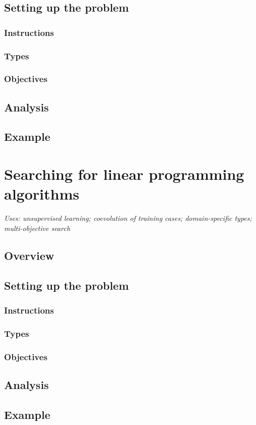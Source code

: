 \documentclass[12pt]{article}
\begin{document}
\subsection{Setting up the problem}

\subsubsection{Instructions}

\subsubsection{Types}

\subsubsection{Objectives}

\subsection{Analysis}

\subsection{Example}

\section{Searching for linear programming algorithms}

\textit{Uses: unsupervised learning; coevolution of training cases; domain-specific types; multi-objective search}

\subsection{Overview}

\subsection{Setting up the problem}

\subsubsection{Instructions}

\subsubsection{Types}

\subsubsection{Objectives}

\subsection{Analysis}

\subsection{Example}
\end{document}
